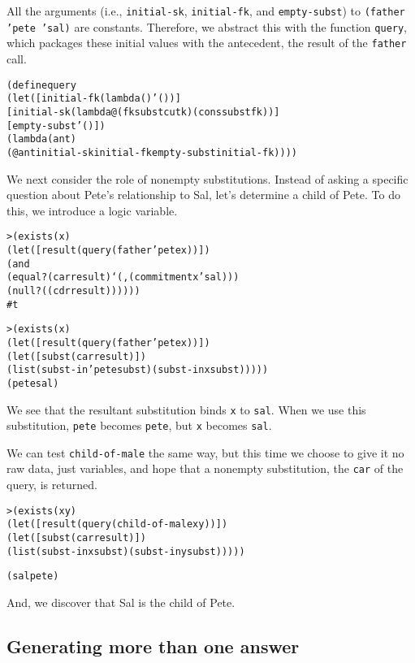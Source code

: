 All the arguments (i.e., \texttt{initial-sk}, \texttt{initial-fk}, and
\texttt{empty-subst}) to \texttt{(father 'pete 'sal)} are
constants. Therefore, we abstract this with the function
\texttt{query}, which packages these initial values with the
antecedent, the result of the \texttt{father} call.

\begin{alltt}
(define query
  (let ([initial-fk (lambda () '())]
        [initial-sk (lambda@ (fk subst cutk) (cons subst fk))]
        [empty-subst '()])
    (lambda (ant)
      (@ ant initial-sk initial-fk empty-subst initial-fk))))
\end{alltt}

We next consider the role of nonempty substitutions.  Instead of
asking a specific question about Pete's relationship to Sal, let's
determine a child of Pete.  To do this, we introduce a logic variable.

\begin{alltt}
> (exists (x)
    (let ([result (query (father 'pete x))])
      (and
        (equal? (car result) `(,(commitment x 'sal)))
        (null? ((cdr result))))))
#t
\end{alltt}

\begin{alltt}
> (exists (x)
    (let ([result (query (father 'pete x))])
      (let ([subst (car result)])
        (list (subst-in 'pete subst) (subst-in x subst)))))
(pete sal)
\end{alltt}

\noindent
We see that the resultant substitution binds \texttt{x} to \texttt{sal}.
When we use this substitution, \texttt{pete} becomes \texttt{pete},
but \texttt{x} becomes \texttt{sal}.

We can test \texttt{child-of-male} the same way, but this time we
choose to give it no raw data, just variables, and hope that a
nonempty substitution, the \texttt{car} of the query, is returned.

\begin{alltt}
> (exists (x y)
    (let ([result (query (child-of-male x y))])
      (let ([subst (car result)])
         (list (subst-in x subst) (subst-in y subst)))))

(sal pete)
\end{alltt}

And, we discover that Sal is the child of Pete.

\subsection{Generating more than one answer}

